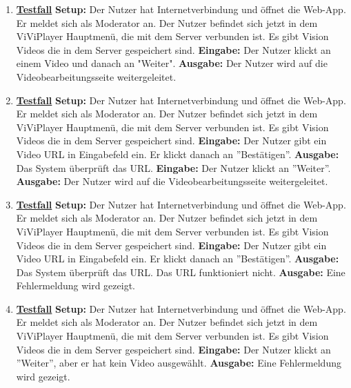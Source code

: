 \begin{enumerate}
	\item \underline{\textbf{Testfall}} \linebreak
	\textbf{Setup:} Der Nutzer hat Internetverbindung und öffnet die Web-App. Er meldet sich als Moderator an. Der Nutzer befindet sich jetzt in dem ViViPlayer Hauptmenü, die mit dem Server verbunden ist. Es gibt Vision Videos die in dem Server gespeichert sind.\linebreak
	\textbf{Eingabe:} Der Nutzer klickt an einem Video und danach an "Weiter". \linebreak
	\textbf{Ausgabe:} Der Nutzer wird auf die Videobearbeitungsseite weitergeleitet. 
	
	\item \underline{\textbf{Testfall}} \linebreak
	\textbf{Setup:} Der Nutzer hat Internetverbindung und öffnet die Web-App. Er meldet sich als Moderator an. Der Nutzer befindet sich jetzt in dem ViViPlayer Hauptmenü, die mit dem Server verbunden ist. Es gibt Vision Videos die in dem Server gespeichert sind.\linebreak
	\textbf{Eingabe:} Der Nutzer gibt ein Video URL in Eingabefeld ein. Er klickt danach an ''Bestätigen''. \linebreak
	\textbf{Ausgabe:} Das System überprüft das URL. \linebreak
	\textbf{Eingabe:} Der Nutzer klickt an ''Weiter''.\linebreak
	\textbf{Ausgabe:} Der Nutzer wird auf die Videobearbeitungsseite weitergeleitet.
	
	\item \underline{\textbf{Testfall}} \linebreak
	\textbf{Setup:} Der Nutzer hat Internetverbindung und öffnet die Web-App. Er meldet sich als Moderator an. Der Nutzer befindet sich jetzt in dem ViViPlayer Hauptmenü, die mit dem Server verbunden ist. Es gibt Vision Videos die in dem Server gespeichert sind.\linebreak
	\textbf{Eingabe:} Der Nutzer gibt ein Video URL in Eingabefeld ein. Er klickt danach an ''Bestätigen''. \linebreak
	\textbf{Ausgabe:} Das System überprüft das URL. Das URL funktioniert nicht. \linebreak
	\textbf{Ausgabe:} Eine Fehlermeldung wird gezeigt.
	
	\item \underline{\textbf{Testfall}} \linebreak
	\textbf{Setup:} Der Nutzer hat Internetverbindung und öffnet die Web-App. Er meldet sich als Moderator an. Der Nutzer befindet sich jetzt in dem ViViPlayer Hauptmenü, die mit dem Server verbunden ist. Es gibt Vision Videos die in dem Server gespeichert sind.\linebreak
	\textbf{Eingabe:} Der Nutzer klickt an ''Weiter'', aber er hat kein Video ausgewählt. \linebreak
	\textbf{Ausgabe:} Eine Fehlermeldung wird gezeigt.
	

\end{enumerate}
